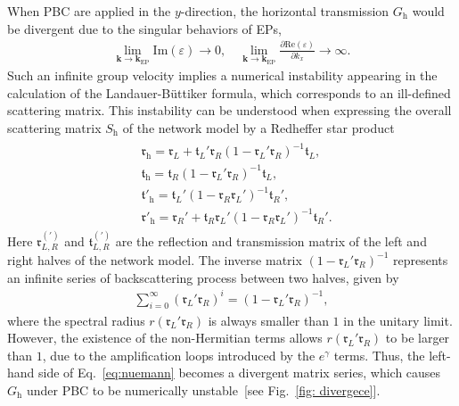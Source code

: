\documentclass[aps,pra,reprint,superscriptaddress,showkeys,amsmath,amssymb,longbibliography]{revtex4-1}
\begin{document}
When PBC are applied in the $y$-direction, the horizontal transmission $G_{\text{h}}$ would be divergent due to the singular behaviors of EPs, 
\begin{eqnarray}
\lim_{\textbf{k}\rightarrow\textbf{k}_{\text{EP}}}\text{Im}(\varepsilon)\rightarrow
  0,\quad \lim_{\textbf{k}\rightarrow\textbf{k}_{\text{EP}}}\frac{\partial \text{Re}(\varepsilon)}{\partial k_x}\rightarrow\infty.
\end{eqnarray}
Such an infinite group velocity implies a numerical instability appearing in the calculation of the Landauer-B{\"u}ttiker formula, which corresponds to an ill-defined scattering matrix. 
This instability can be understood when expressing the overall scattering matrix $S_\text{h}$ of the network model by a Redheffer star product \cite{Redheffer}
\begin{align}\label{eq:combiningS}
\begin{split}
& \mathfrak{r}_\text{h} = \mathfrak{r}_L + \mathfrak{t}_L' \mathfrak{r}_R (1 - \mathfrak{r}_L' \mathfrak{r}_R)^{-1} \mathfrak{t}_L, \\
& \mathfrak{t}_\text{h} = \mathfrak{t}_R (1 - \mathfrak{r}_L' \mathfrak{r}_R)^{-1} \mathfrak{t}_L, \\
& \mathfrak{t}'_\text{h} = \mathfrak{t}_L' (1 - \mathfrak{r}_R \mathfrak{r}_L')^{-1} \mathfrak{t}_R', \\
& \mathfrak{r}'_\text{h} = \mathfrak{r}_R' + \mathfrak{t}_R \mathfrak{r}_L' (1 - \mathfrak{r}_R \mathfrak{r}_L')^{-1} \mathfrak{t}_R'.
\end{split}
\end{align}
Here $\mathfrak{r}^{(\prime)}_{L,R}$ and $\mathfrak{t}^{(\prime)}_{L,R}$ are the reflection and transmission matrix of the left and right halves of the network model.
The inverse matrix $(1 - \mathfrak{r}_L' \mathfrak{r}_R)^{-1}$ represents an infinite series of backscattering process between two halves, given by
\begin{eqnarray}
\sum_{i=0}^{\infty}(\mathfrak{r}_L' \mathfrak{r}_R)^i=(1 - \mathfrak{r}_L' \mathfrak{r}_R)^{-1},\label{eq:nuemann}
\end{eqnarray}
where the spectral radius $r(\mathfrak{r}_L' \mathfrak{r}_R)$ is always smaller than $1$ in the unitary limit.
However, the existence of the non-Hermitian terms allows $r(\mathfrak{r}_L' \mathfrak{r}_R)$ to be larger than $1$, due to the amplification loops introduced by the $e^\gamma$ terms.
Thus, the left-hand side of Eq.~\eqref{eq:nuemann} becomes a divergent matrix series, which causes $G_{\text{h}}$ under PBC to be numerically unstable~[see Fig.~\ref{fig: divergece}].
\end{document}
